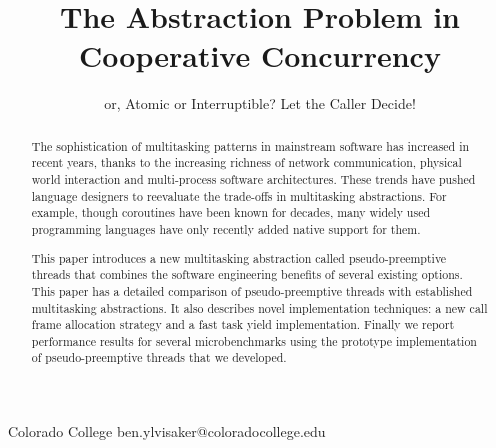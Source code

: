\documentclass[9pt,preprint]{sigplanconf}
\begin{document}
\newcommand{\charcoal}{Charcoal}
\newcommand{\noyield}{\texttt{no\_yield}}

\setlength{\pdfpageheight}{\paperheight}
\setlength{\pdfpagewidth}{\paperwidth}



\title{The Abstraction Problem in Cooperative Concurrency}
\subtitle{or, Atomic or Interruptible?
Let the Caller Decide!}

           {Colorado College}
           {ben.ylvisaker@coloradocollege.edu}

\maketitle

\begin{abstract}

The sophistication of multitasking patterns in mainstream software has increased in recent years, thanks to the increasing richness of network communication, physical world interaction and multi-process software architectures.
These trends have pushed language designers to reevaluate the trade-offs in multitasking abstractions.
For example, though coroutines have been known for decades, many widely used programming languages have only recently added native support for them.

This paper introduces a new multitasking abstraction called pseudo-preemptive threads that combines the software engineering benefits of several existing options.
This paper has a detailed comparison of pseudo-preemptive threads with established multitasking abstractions.
It also describes novel implementation techniques: a new call frame allocation strategy and a fast task yield implementation.
Finally we report performance results for several microbenchmarks using the prototype implementation of pseudo-preemptive threads that we developed.

\end{abstract}
\end{document}
